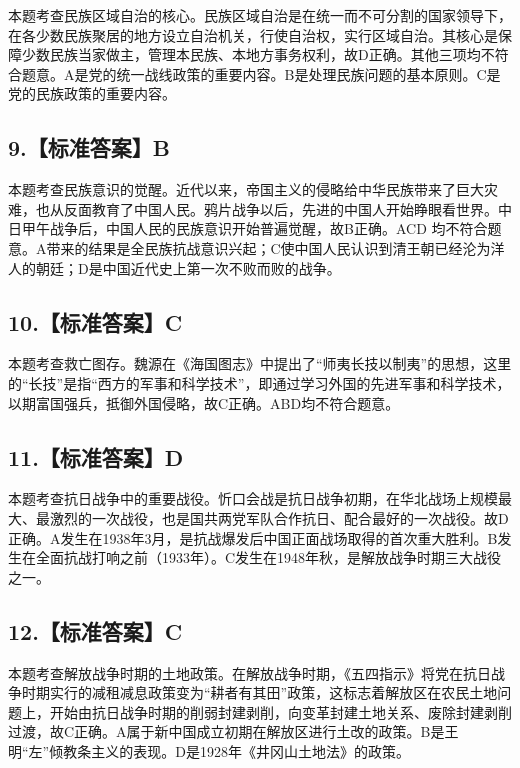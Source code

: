 \documentclass[UTF8,11pt]{ctexart}
\begin{document}
本题考查民族区域自治的核心。民族区域自治是在统一而不可分割的国家领导下，在各少数民族聚居的地方设立自治机关，行使自治权，实行区域自治。其核心是保障少数民族当家做主，管理本民族、本地方事务权利，故D正确。其他三项均不符合题意。A是党的统一战线政策的重要内容。B是处理民族问题的基本原则。C是党的民族政策的重要内容。


\subsection*{9.【标准答案】B}

本题考查民族意识的觉醒。近代以来，帝国主义的侵略给中华民族带来了巨大灾难，也从反面教育了中国人民。鸦片战争以后，先进的中国人开始睁眼看世界。中日甲午战争后，中国人民的民族意识开始普遍觉醒，故B正确。ACD 均不符合题意。A带来的结果是全民族抗战意识兴起；C使中国人民认识到清王朝已经沦为洋人的朝廷；D是中国近代史上第一次不败而败的战争。


\subsection*{10.【标准答案】C}

本题考查救亡图存。魏源在《海国图志》中提出了“师夷长技以制夷”的思想，这里的“长技”是指“西方的军事和科学技术”，即通过学习外国的先进军事和科学技术，以期富国强兵，抵御外国侵略，故C正确。ABD均不符合题意。


\subsection*{11.【标准答案】D}

本题考查抗日战争中的重要战役。忻口会战是抗日战争初期，在华北战场上规模最大、最激烈的一次战役，也是国共两党军队合作抗日、配合最好的一次战役。故D正确。A发生在1938年3月，是抗战爆发后中国正面战场取得的首次重大胜利。B发生在全面抗战打响之前（1933年）。C发生在1948年秋，是解放战争时期三大战役之一。


\subsection*{12.【标准答案】C}

本题考查解放战争时期的土地政策。在解放战争时期，《五四指示》将党在抗日战争时期实行的减租减息政策变为“耕者有其田”政策，这标志着解放区在农民土地问题上，开始由抗日战争时期的削弱封建剥削，向变革封建土地关系、废除封建剥削过渡，故C正确。A属于新中国成立初期在解放区进行土改的政策。B是王明“左”倾教条主义的表现。D是1928年《井冈山土地法》的政策。
\end{document}
